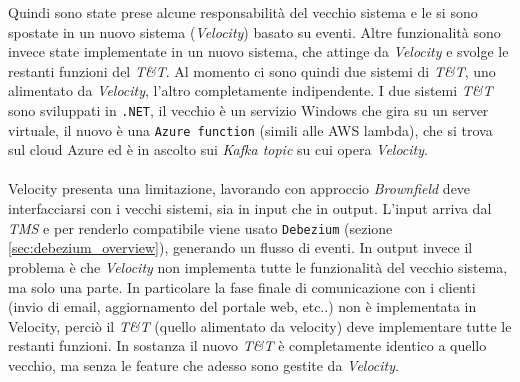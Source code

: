 Quindi sono state prese alcune responsabilità del vecchio sistema e le si sono spostate in un nuovo sistema (\textit{Velocity}) basato su eventi.
Altre funzionalità sono invece state implementate in un nuovo sistema, che attinge da \textit{Velocity} e svolge le restanti funzioni del \textit{T\&T}.
Al momento ci sono quindi due sistemi di \textit{T\&T}, uno alimentato da \textit{Velocity}, l'altro completamente indipendente.
I due sistemi \textit{T\&T} sono sviluppati in \texttt{.NET}, il vecchio è un servizio Windows che gira su un server virtuale, 
il nuovo è una \texttt{Azure function} (simili alle AWS lambda), che si trova sul cloud Azure ed è in ascolto sui \textit{Kafka topic} su cui opera \textit{Velocity}.
\\\\
Velocity presenta una limitazione, lavorando con approccio \textit{Brownfield} deve interfacciarsi con i vecchi sistemi, sia in input che in output.
L'input arriva dal \textit{TMS} e per renderlo compatibile viene usato \texttt{Debezium} (sezione \ref{sec:debezium_overview}), generando un flusso di eventi.
In output invece il problema è che \textit{Velocity} non implementa tutte le funzionalità del vecchio sistema, ma solo una parte.
In particolare la fase finale di comunicazione con i clienti (invio di email, aggiornamento del portale web, etc..) non è implementata in Velocity,
perciò il \textit{T\&T} (quello alimentato da velocity) deve implementare tutte le restanti funzioni.
In sostanza il nuovo \textit{T\&T} è completamente identico a quello vecchio, ma senza le feature che adesso sono gestite da \textit{Velocity}.

